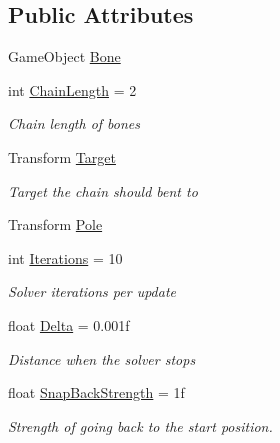 \subsection*{Public Attributes}
\begin{DoxyCompactItemize}
\item 
Game\+Object \mbox{\hyperlink{class_ditzel_games_1_1_fast_i_k_1_1_fast_i_k_aeb4c85ea42386056407d55a6f8ce53f0}{Bone}}
\item 
int \mbox{\hyperlink{class_ditzel_games_1_1_fast_i_k_1_1_fast_i_k_a9fceb1a8efe626157b523c4100b3805e}{Chain\+Length}} = 2
\begin{DoxyCompactList}\small\item\em Chain length of bones \end{DoxyCompactList}\item 
Transform \mbox{\hyperlink{class_ditzel_games_1_1_fast_i_k_1_1_fast_i_k_acc174a0910d921eb1a14fb857cef9341}{Target}}
\begin{DoxyCompactList}\small\item\em Target the chain should bent to \end{DoxyCompactList}\item 
Transform \mbox{\hyperlink{class_ditzel_games_1_1_fast_i_k_1_1_fast_i_k_ab01d74cb07843603e8958a6e8f029091}{Pole}}
\item 
int \mbox{\hyperlink{class_ditzel_games_1_1_fast_i_k_1_1_fast_i_k_a6bc8f292922a3e2649c2ef363b1b222f}{Iterations}} = 10
\begin{DoxyCompactList}\small\item\em Solver iterations per update \end{DoxyCompactList}\item 
float \mbox{\hyperlink{class_ditzel_games_1_1_fast_i_k_1_1_fast_i_k_a9f34b9c0fbf01891b864c7b938b6f677}{Delta}} = 0.\+001f
\begin{DoxyCompactList}\small\item\em Distance when the solver stops \end{DoxyCompactList}\item 
float \mbox{\hyperlink{class_ditzel_games_1_1_fast_i_k_1_1_fast_i_k_a683d2c8ba51d312472f67d42d3652cfe}{Snap\+Back\+Strength}} = 1f
\begin{DoxyCompactList}\small\item\em Strength of going back to the start position. \end{DoxyCompactList}\end{DoxyCompactItemize}

